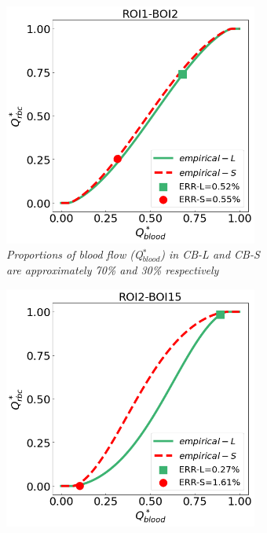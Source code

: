 \begin{figure}[H]
\centering
\begin{subfigure}{0.48 \textwidth}
    \includegraphics[width=0.92\textwidth]{images/DeviationsPSM1.png}
    \caption{\textit{Proportions of blood flow (Q$^{*}_{blood}$) in CB-L and CB-S are approximately 70\% and 30\% respectively} \label{DeviationsPSM1}}
\end{subfigure}
\hfill
\begin{subfigure}{0.48 \textwidth}
    \includegraphics[width=0.92\textwidth]{images/DeviationsPSM2.png}

\end{subfigure}
\end{figure}
